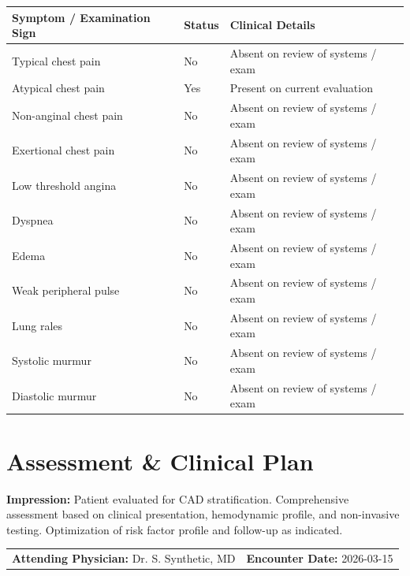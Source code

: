\documentclass[10pt,a4paper]{article}
\begin{document}
\begin{tabular}{@{} p{6.8cm} p{2.8cm} p{5.5cm} @{}}
  \toprule
  \textbf{Symptom / Examination Sign} & \textbf{Status} & \textbf{Clinical Details} \\
  \midrule
  Typical chest pain & No & Absent on review of systems / exam \\
  Atypical chest pain & Yes & Present on current evaluation \\
  Non-anginal chest pain & No & Absent on review of systems / exam \\
  Exertional chest pain & No & Absent on review of systems / exam \\
  Low threshold angina & No & Absent on review of systems / exam \\
  Dyspnea & No & Absent on review of systems / exam \\
  Edema & No & Absent on review of systems / exam \\
  Weak peripheral pulse & No & Absent on review of systems / exam \\
  Lung rales & No & Absent on review of systems / exam \\
  Systolic murmur & No & Absent on review of systems / exam \\
  Diastolic murmur & No & Absent on review of systems / exam \\
  \bottomrule
\end{tabular}

\vspace{8pt}

\section*{Assessment \& Clinical Plan}

\noindent
\textbf{Impression:} Patient evaluated for CAD stratification. Comprehensive assessment based on clinical presentation, hemodynamic profile, and non-invasive testing. Optimization of risk factor profile and follow-up as indicated.

\vspace{14pt}

\noindent
\begin{tabular*}{\textwidth}{@{} l @{\extracolsep{\fill}} r @{}}
  \textbf{Attending Physician:} Dr. S. Synthetic, MD & \textbf{Encounter Date:} 2026-03-15 \\
\end{tabular*}
\end{document}
